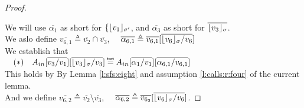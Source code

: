 \begin{proof} $ ~ $ 

We will use $\overline {\alpha_1}$ as short for $\{\interpret {\sigma'} {v_1}$, and $\overline {\alpha_3}$ as short for $\overline {\interpret \sigma {v_3} }$.
\\
We aslo define  $\overline{v_{6,1}} \triangleq \overline{v_2} \cap \overline{v_3}$, \ \ 
   $\overline {\alpha_{6,1}} \triangleq  \overline {v_{6,1}} [\overline {\interpret {\sigma} {v_6}/v_6 }]$
\\
We  establish that\\
$\ \strut \ \  (*) \ \ \  \Ain[\overline {v_3/v_1}][\overline { {\interpret \sigma {v_3} }/v_3 }] \txteq \Ain[\overline  {\alpha_1/v_1}][\overline { \alpha_{6,1}/v_{6,1}}] $\\
This holds by  By Lemma \ref{l:sfs:eight} and assumption \ref{l:calls:r:four} of the current lemma.
\\
And we define    $\overline{v_{6,2}} \triangleq \overline{v_2} \setminus \overline{v_3}$, \ \ 
       $\overline {\alpha_{6,2}} \triangleq  \overline {v_{6_2}} [\overline {\interpret {\sigma} {v_6}/v_6 }]$.



\end{proof}
